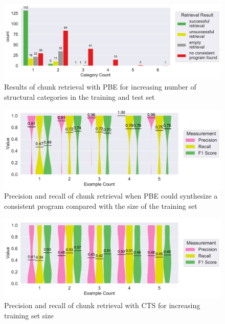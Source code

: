 \documentclass[\myrootdir/main.tex]{subfiles}
\begin{document}
\begin{figure}[htbp]
		\centering
		\includegraphics[width=\textwidth, clip]{img/big-study/failure-reason-categorycount-PBE.pdf}
		\caption{Results of chunk retrieval with PBE for increasing number of structural categories in the training and test set}
		\label{fig:failure-reason-categorycount-PBE}
\end{figure}

\begin{figure}[htbp]
		\centering
		\includegraphics[width=\textwidth, clip]{img/big-study/recall-precision-examplecount-sythesisworked-PBE.pdf}
		\caption{Precision and recall of chunk retrieval when PBE could synthesize a consistent program compared with the size of the training set}
		\label{fig:recall-precision-examplecount-sythesisworked-PBE}
\end{figure}

\begin{figure}[htbp]
		\centering
		\includegraphics[width=\textwidth, clip]{img/big-study/recall-precision-examplecount-CTS.pdf}
		\caption{Precision and recall of chunk retrieval with CTS for increasing training set size}
		\label{fig:recall-precision-examplecount-CTS}
\end{figure}
\end{document}
